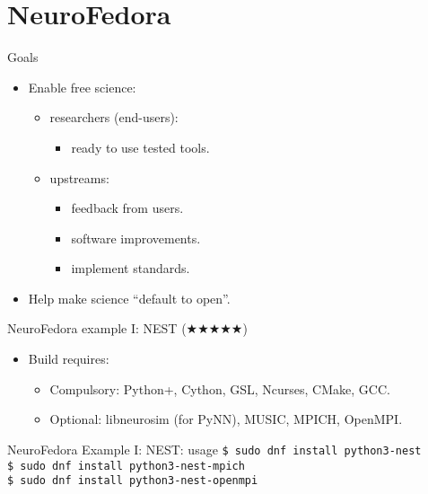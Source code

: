 \section{NeuroFedora}
\begin{frame}[c]{Goals}
  \begin{itemize}
    \item Enable \alert{free science}:
      \pause{}
      \begin{itemize}
        \item researchers (end-users):
          \begin{itemize}
            \item ready to use \alert{tested} tools.
          \end{itemize}
          \pause{}
        \item upstreams:
          \begin{itemize}
            \item feedback from users.
            \item software improvements.
            \item implement standards.
          \end{itemize}
      \end{itemize}
      \pause{}
    \item Help make science \alert{\enquote{default to open}}.
  \end{itemize}
\end{frame}
\begin{frame}[c]{NeuroFedora example I\@: NEST (\(\bigstar\bigstar\bigstar\bigstar\bigstar\))}
  \begin{itemize}
    \item Build requires\footnotemark:
      \begin{itemize}
        \item \alert{Compulsory:} Python+, Cython, GSL, Ncurses, CMake, GCC\@.
          \pause{}
        \item \alert{Optional:} libneurosim (for PyNN), MUSIC, MPICH, OpenMPI\@.
      \end{itemize}
  \end{itemize}
\end{frame}
\begin{frame}[c]{NeuroFedora Example I\@: NEST\@: usage}
  \texttt{\$ sudo dnf install python3-nest}\\
  \texttt{\$ sudo dnf install python3-nest-mpich}\\
  \texttt{\$ sudo dnf install python3-nest-openmpi}
\end{frame}
